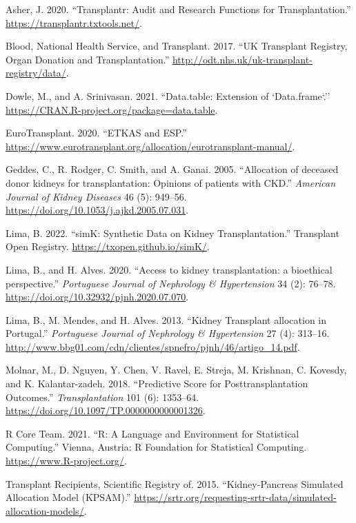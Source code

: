 \documentclass[
]{article}
\newlength{\cslhangindent}
\newlength{\cslentryspacingunit} %
\newenvironment{CSLReferences}[2] %
 {%
  \setlength{\parindent}{0pt}
  \ifodd #1
  \let\oldpar\par
  \def\par{\hangindent=\cslhangindent\oldpar}
  \fi
  \setlength{\parskip}{#2\cslentryspacingunit}
 }%
 {}
\begin{document}
\hypertarget{refs}{}
\begin{CSLReferences}{1}{0}
\leavevmode{}%
Asher, J. 2020. {``Transplantr: Audit and Research Functions for
Transplantation.''} \url{https://transplantr.txtools.net/}.

\leavevmode{}%
Blood, National Health Service, and Transplant. 2017. {``{UK Transplant
Registry, Organ Donation and Transplantation}.''}
\url{http://odt.nhs.uk/uk-transplant-registry/data/}.

\leavevmode{}%
Dowle, M., and A. Srinivasan. 2021. {``Data.table: Extension of
`Data.frame`.''} \url{https://CRAN.R-project.org/package=data.table}.

\leavevmode{}%
EuroTransplant. 2020. {``{ETKAS and ESP}.''}
\url{https://www.eurotransplant.org/allocation/eurotransplant-manual/}.

\leavevmode{}%
Geddes, C., R. Rodger, C. Smith, and A. Ganai. 2005. {``{Allocation of
deceased donor kidneys for transplantation: Opinions of patients with
CKD}.''} \emph{American Journal of Kidney Diseases} 46 (5): 949--56.
\url{https://doi.org/10.1053/j.ajkd.2005.07.031}.

\leavevmode{}%
Lima, B. 2022. {``simK: Synthetic Data on Kidney Transplantation.''}
Transplant Open Registry. \url{https://txopen.github.io/simK/}.

\leavevmode{}%
Lima, B., and H. Alves. 2020. {``{Access to kidney transplantation: a
bioethical perspective}.''} \emph{Portuguese Journal of Nephrology \&
Hypertension} 34 (2): 76--78.
\url{https://doi.org/10.32932/pjnh.2020.07.070}.

\leavevmode{}%
Lima, B., M. Mendes, and H. Alves. 2013. {``{Kidney Transplant
allocation in Portugal}.''} \emph{Portuguese Journal of Nephrology \&
Hypertension} 27 (4): 313--16.
\url{http://www.bbg01.com/cdn/clientes/spnefro/pjnh/46/artigo_14.pdf}.

\leavevmode{}%
Molnar, M., D. Nguyen, Y. Chen, V. Ravel, E. Streja, M. Krishnan, C.
Kovesdy, and K. Kalantar-zadeh. 2018. {``{Predictive Score for
Posttransplantation Outcomes}.''} \emph{Transplantation} 101 (6):
1353--64. \url{https://doi.org/10.1097/TP.0000000000001326}.

\leavevmode{}%
R Core Team. 2021. {``R: A Language and Environment for Statistical
Computing.''} Vienna, Austria: R Foundation for Statistical Computing.
\url{https://www.R-project.org/}.

\leavevmode{}%
Transplant Recipients, Scientific Registry of. 2015. {``Kidney-Pancreas
Simulated Allocation Model (KPSAM).''}
\url{https://srtr.org/requesting-srtr-data/simulated-allocation-models/}.

\end{CSLReferences}
\end{document}
